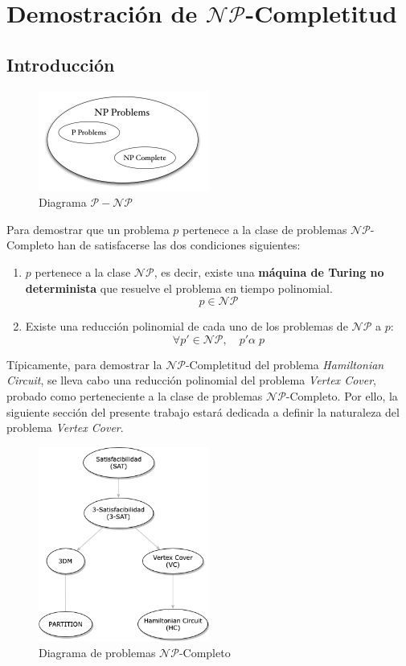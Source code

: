 \documentclass[a4paper]{article}
\begin{document}
\section{Demostración de $\mathcal{NP}$-Completitud}

\subsection{Introducción}

\begin{figure}[ht]
\centering
\includegraphics[width=0.5\textwidth]{images/p-np.jpg}
\caption{Diagrama $\mathcal{P-NP}$}
\end{figure}

Para demostrar que un problema $p$ pertenece a la clase de problemas $\mathcal{NP}$-Completo han de satisfacerse las dos condiciones siguientes:

\begin{enumerate}
    \item $p$ pertenece a la clase $\mathcal{NP}$, es decir, existe una \textbf{máquina de Turing no determinista} que resuelve el problema en tiempo polinomial.
    \[p \in \mathcal{NP}\]
    \item Existe una reducción polinomial de cada uno de los problemas de $\mathcal{NP}$ a $p$:
    \[\forall p' \in \mathcal{NP}, \quad p'\alpha\; p\]
\end{enumerate}

Típicamente, para demostrar la $\mathcal{NP}$-Completitud del problema \textit{Hamiltonian Circuit}, se lleva cabo una reducción polinomial del problema \textit{Vertex Cover}, probado como perteneciente a la clase de problemas $\mathcal{NP}$-Completo. Por ello, la siguiente sección del presente trabajo estará dedicada a definir la naturaleza del problema \textit{Vertex Cover}.

\begin{figure}[ht]
\centering
\includegraphics[width=0.5\textwidth]{images/NP-Completo-1.png}
\caption{Diagrama de problemas $\mathcal{NP}$-Completo}
\end{figure}
\end{document}
